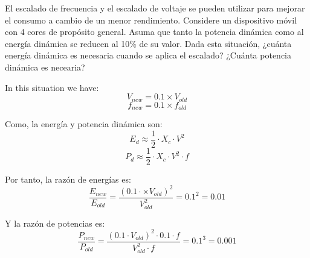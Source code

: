 \begin{acexercise}
\end{acexercise}

El escalado de frecuencia y el escalado de voltaje se pueden utilizar para
mejorar el consumo a cambio de un menor rendimiento. Considere un dispositivo
móvil con 4 cores de propósito general. Asuma que tanto la potencia dinámica
como al energía dinámica se reducen al 10\% de su valor. Dada esta situación,
¿cuánta energía dinámica es necesaria cuando se aplica el escalado? ¿Cuánta
potencia dinámica es necearia?

\begin{acsolution}
\end{acsolution}

In this situation we have:
\[V_{new} = 0.1 \times V_{old}\]
\[f_{new} = 0.1 \times f_{old}\]

Como, la energía y potencia dinámica son:
\[
E_d \approx \frac{1}{2} \cdot X_c \cdot V^2
\]
\[
P_d \approx \frac{1}{2} \cdot X_c \cdot V^2 \cdot f
\]

Por tanto, la razón de energías es:
\[
\frac{E_{new}}{E_{old}} =
\frac{(0.1 \cdot \times V_{old})^2}{V_{old}^2} =
0.1^2 =
0.01
\] 

Y la razón de potencias es:
\[
\frac{P_{new}}{P_{old}} =
\frac{(0.1 \cdot V_{old})^2 \cdot 0.1 \cdot f}{V_{old}^2 \cdot f} =
0.1^3 =
0.001
\]
